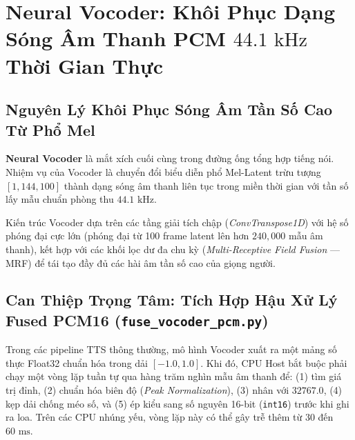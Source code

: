 \documentclass[11pt,a4paper,oneside,table]{report}
\begin{document}
\chapter{Neural Vocoder: Khôi Phục Dạng Sóng Âm Thanh PCM $44.1\text{ kHz}$ Thời Gian Thực}
\label{chap:vocoder}

\section{Nguyên Lý Khôi Phục Sóng Âm Tần Số Cao Từ Phổ Mel}
\textbf{Neural Vocoder} là mắt xích cuối cùng trong đường ống tổng hợp tiếng nói. Nhiệm vụ của Vocoder là chuyển đổi biểu diễn phổ Mel-Latent trừu tượng $[1, 144, 100]$ thành dạng sóng âm thanh liên tục trong miền thời gian với tần số lấy mẫu chuẩn phòng thu $44.1\text{ kHz}$.

Kiến trúc Vocoder dựa trên các tầng giải tích chập (\textit{ConvTranspose1D}) với hệ số phóng đại cực lớn (phóng đại từ 100 frame latent lên hơn $240,000$ mẫu âm thanh), kết hợp với các khối lọc dư đa chu kỳ (\textit{Multi-Receptive Field Fusion} --- MRF) để tái tạo đầy đủ các hài âm tần số cao của giọng người.

\section{Can Thiệp Trọng Tâm: Tích Hợp Hậu Xử Lý Fused PCM16 (\texttt{fuse\_vocoder\_pcm.py})}
Trong các pipeline TTS thông thường, mô hình Vocoder xuất ra một mảng số thực Float32 chuẩn hóa trong dải $[-1.0, 1.0]$. Khi đó, CPU Host bắt buộc phải chạy một vòng lặp tuần tự qua hàng trăm nghìn mẫu âm thanh để: (1) tìm giá trị đỉnh, (2) chuẩn hóa biên độ (\textit{Peak Normalization}), (3) nhân với $32767.0$, (4) kẹp dải chống méo số, và (5) ép kiểu sang số nguyên 16-bit (\texttt{int16}) trước khi ghi ra loa. Trên các CPU nhúng yếu, vòng lặp này có thể gây trễ thêm từ $30$ đến $60\text{ ms}$.
\end{document}
